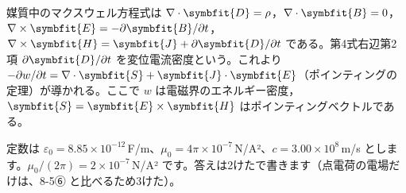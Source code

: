 \begin{senmonsho}[マクスウェル方程式とポインティングの定理]
\begin{bkhonbun}
媒質中のマクスウェル方程式は $\nabla\cdot\symbfit{D}=\rho$，$\nabla\cdot\symbfit{B}=0$，$\nabla\times\symbfit{E}=-\partial\symbfit{B}/\partial t$，$\nabla\times\symbfit{H}=\symbfit{J}+\partial\symbfit{D}/\partial t$ である。第4式右辺第2項 $\partial\symbfit{D}/\partial t$ を変位電流密度という。これより $-\partial w/\partial t=\nabla\cdot\symbfit{S}+\symbfit{J}\cdot\symbfit{E}$（ポインティングの定理）が導かれる。ここで $w$ は電磁界のエネルギー密度，$\symbfit{S}=\symbfit{E}\times\symbfit{H}$ はポインティングベクトルである。
\end{bkhonbun}
\end{senmonsho}


\noindent 定数は $\varepsilon_0=8.85\times10^{-12}$\,F/m、$\mu_0=4\pi\times10^{-7}$\,N/A²、$c=3.00\times10^8$\,m/s とします。$\mu_0/(2\pi)=2\times10^{-7}$\,N/A² です。答えは2けたで書きます（点電荷の電場だけは、8-5⑥ と比べるため3けた）。

